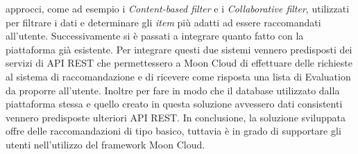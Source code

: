 \documentclass[10pt,a4paper]{article}
\begin{document}
approcci, come ad esempio i \textit{Content-based filter} e i \textit{Collaborative filter}, utilizzati per filtrare i dati e determinare gli \textit{item} 
più adatti ad essere raccomandati all'utente. Successivamente si è passati a integrare quanto fatto con la piattaforma già esistente. Per integrare 
questi due sistemi vennero predisposti dei servizi di API REST che permettessero a 
Moon Cloud di effettuare delle richieste al sistema di raccomandazione e di ricevere come risposta una lista di Evaluation da proporre all'utente.
Inoltre per fare in modo che il database utilizzato dalla piattaforma stessa e quello creato in questa soluzione avvessero dati consistenti vennero predisposte 
ulteriori API REST.\hfill\break
In conclusione, la soluzione sviluppata offre delle raccomandazioni di tipo basico, tuttavia è in grado di supportare gli utenti nell'utilizzo del framework 
Moon Cloud.
\end{document}
